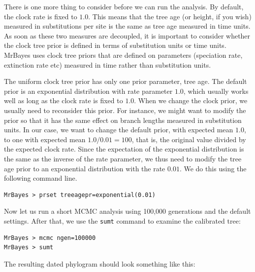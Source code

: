 \documentclass[12pt]{book}
\newcommand{\ttt}[1]{\texttt{#1}}
\begin{document}
There is one more thing to consider before we can run the analysis. By default, the clock rate is
fixed to $1.0$. This means that the tree age (or height, if you wish) measured in substitutions
per site is the same as tree age measured in time units. As soon as these two measures are
decoupled, it is important to consider whether the clock tree prior is defined in terms of
substitution units or time units. MrBayes uses clock tree priors that are defined on parameters
(speciation rate, extinction rate etc) measured in time rather than substitution units.

The uniform clock tree prior has only one prior parameter, tree age. The default prior is an
exponential distribution with rate parameter $1.0$, which usually works well as long as the clock
rate is fixed to $1.0$. When we change the clock prior, we usually need to reconsider this prior.
For instance, we might want to modify the prior so that it has the same effect on branch lengths
measured in substitution units. In our case, we want to change the default prior, with expected
mean $1.0$, to one with expected mean $1.0 / 0.01 = 100$, that is, the original value divided by
the expected clock rate. Since the expectation of the exponential distribution is the same as the
inverse of the rate parameter, we thus need to modify the tree age prior to an exponential
distribution with the rate $0.01$. We do this using the following command line.

\begin{verbatim}
MrBayes > prset treeagepr=exponential(0.01)
\end{verbatim}

Now let us run a short MCMC analysis using 100,000 generations and the default settings. After
that, we use the \ttt{sumt} command to examine the calibrated tree:

\begin{singlespacing}
\begin{verbatim}
MrBayes > mcmc ngen=100000
MrBayes > sumt
\end{verbatim}
\end{singlespacing}

The resulting dated phylogram should look something like this:
\end{document}
